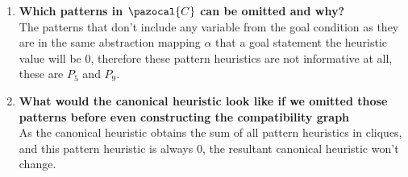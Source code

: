 \documentclass[11pt,a4paper]{article}
\begin{document}
\begin{enumerate}[label=(\alph*), listparindent=1.5em]
\begin{multicols}{3}
		\[ h^{\pazocal{C}}=13\]
	\end{multicols}
	\item \textbf{Which patterns in $\pazocal{C}$ can be omitted and why?}\\
	The patterns that don't include any variable from the goal condition as they are in the same abstraction mapping $\alpha$ that a goal statement the heuristic value will be 0, therefore these pattern heuristics are not informative at all, these are $P_5$ and $P_9$. 
	\item \textbf{What would the canonical heuristic look like if we omitted
	those patterns before even constructing the compatibility graph}\\
	As the canonical heuristic obtains the sum of all pattern heuristics in cliques, and this pattern heuristic is always 0, the resultant canonical heuristic won't change.\\
\end{enumerate}
\pagebreak
\end{document}
